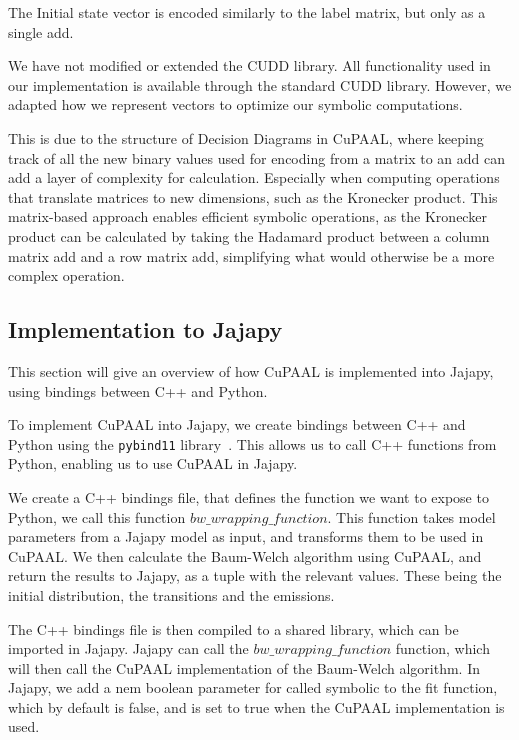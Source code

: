 The Initial state vector is encoded similarly to the label matrix, but only as a single \gls{add}.

We have not modified or extended the CUDD library.
All functionality used in our implementation is available through the standard CUDD library.
However, we adapted how we represent vectors to optimize our symbolic computations.

This is due to the structure of Decision Diagrams in CuPAAL, where keeping track of all the new binary values used for encoding from a matrix to an \gls{add} can add a layer of complexity for calculation.
Especially when computing operations that translate matrices to new dimensions, such as the Kronecker product.
This matrix-based approach enables efficient symbolic operations, as the Kronecker product can be calculated by taking the Hadamard product between a column matrix \gls{add} and a row matrix \gls{add}, simplifying what would otherwise be a more complex operation.


\subsection{Implementation to Jajapy}\label{subsec:implementation-to-jajapy}
This section will give an overview of how CuPAAL is implemented into Jajapy, using bindings between C++ and Python.

To implement CuPAAL into Jajapy, we create bindings between C++ and Python using the \texttt{pybind11} library~\cite{pybind11github}.
This allows us to call C++ functions from Python, enabling us to use CuPAAL in Jajapy.

We create a C++ bindings file, that defines the function we want to expose to Python, we call this function $bw\_wrapping\_function$.
This function takes model parameters from a Jajapy model as input, and transforms them to be used in CuPAAL.
We then calculate the Baum-Welch algorithm using CuPAAL, and return the results to Jajapy, as a tuple with the relevant values.
These being the initial distribution, the transitions and the emissions.

The C++ bindings file is then compiled to a shared library, which can be imported in Jajapy.
Jajapy can call the $bw\_wrapping\_function$ function, which will then call the CuPAAL implementation of the Baum-Welch algorithm.
In Jajapy, we add a nem boolean parameter for called symbolic to the fit function, which by default is false, and is set to true when the CuPAAL implementation is used.

